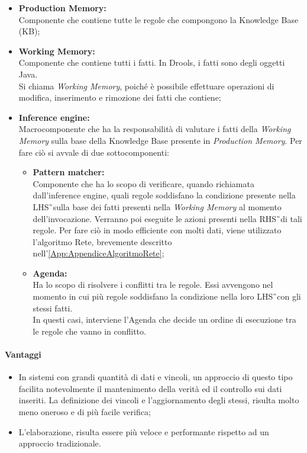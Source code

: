 	\begin{itemize}
		\item \textbf{Production Memory:} \\ Componente che contiene tutte le regole che compongono la Knowledge Base (KB);
		\item  \textbf{Working Memory: } \\ Componente che contiene tutti i fatti. In Drools, i fatti sono degli oggetti Java. \\  Si chiama \textit{Working Memory}, poiché  è possibile effettuare operazioni di modifica, inserimento e rimozione dei fatti che contiene;
		\item \textbf{Inference engine: } \\ Macrocomponente che ha la responsabilità di valutare i fatti della \textit{Working Memory} sulla base della Knowledge Base presente in \textit{Production Memory}. Per fare ciò si avvale di due sottocomponenti:
		\begin{itemize}
			\item \textbf{Pattern matcher: } \\ Componente che ha lo scopo di verificare, quando richiamata dall'inference engine, quali regole soddisfano la condizione presente nella \gls{LHS}\G\ sulla base dei fatti presenti nella  \textit{Working Memory} al momento dell'invocazione. Verranno poi eseguite le azioni  presenti nella \gls{RHS}\G\ di tali regole. Per fare ciò in modo efficiente con molti dati, viene utilizzato l'algoritmo Rete, brevemente descritto nell'\autoref{App:AppendiceAlgoritmoRete};
			\item \textbf{Agenda: } \\ Ha lo scopo di risolvere i conflitti tra le regole. Essi avvengono nel momento in cui più regole soddisfano la condizione nella loro \gls{LHS}\G\  con gli stessi fatti. \\ In questi casi, interviene l'Agenda che decide un ordine di esecuzione tra le regole che vanno in conflitto.
		\end{itemize}
	\end{itemize}
	
\paragraph{Vantaggi}
	\begin{itemize}
		\item In sistemi con grandi quantità di dati e vincoli, un approccio di questo tipo facilita notevolmente il mantenimento della verità ed il controllo sui dati inseriti. La definizione dei vincoli e l'aggiornamento degli stessi, risulta molto meno oneroso e di più facile verifica;
		\item L'elaborazione, risulta essere più veloce e performante rispetto ad un approccio tradizionale.
	\end{itemize}
